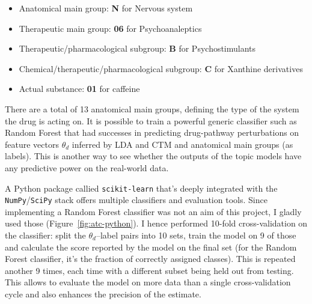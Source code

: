 \documentclass[12pt,a4paper,twoside,openright]{report}
\begin{document}
\begin{itemize}[noitemsep]
\item Anatomical main group: \textbf{N} for Nervous system
\item Therapeutic main group: \textbf{06} for Psychoanaleptics
\item Therapeutic/pharmacological subgroup: \textbf{B} for Psychostimulants
\item Chemical/therapeutic/pharmacological subgroup: \textbf{C} for Xanthine derivatives
\item Actual substance: \textbf{01} for caffeine
\end{itemize}

There are a total of 13 anatomical main groups, defining the type of the system the drug is acting on. It is possible to train a powerful generic classifier such as Random Forest\cite{Breiman:2001:RF:570181.570182} that had successes in predicting drug-pathway perturbations\cite{Riddick15012011} on feature vectors $\theta_d$ inferred by LDA and CTM and anatomical main groups (as labels). This is another way to see whether the outputs of the topic models have any predictive power on the real-world data.

A Python package callied \texttt{scikit-learn} \cite{scikit-learn} that's deeply integrated with the \texttt{NumPy}/\texttt{SciPy} stack offers multiple classifiers and evaluation tools. Since implementing a Random Forest classifier was not an aim of this project, I gladly used those (Figure~\ref{fig:atc-python}). I hence performed 10-fold cross-validation on the classifier: split the $\theta_d$--label pairs into 10 sets, train the model on 9 of those and calculate the score reported by the model on the final set (for the Random Forest classifier, it's the fraction of correctly assigned classes). This is repeated another 9 times, each time with a different subset being held out from testing. This allows to evaluate the model on more data than a single cross-validation cycle and also enhances the precision of the estimate.
\end{document}
